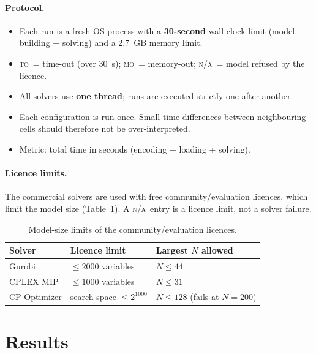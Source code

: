 \documentclass[a4paper,fleqn]{cas-sc}
\newcommand{\TO}{\textsc{to}}
\newcommand{\MO}{\textsc{mo}}
\newcommand{\NA}{\textsc{n/a}}
\begin{document}
\paragraph{Protocol.}
\begin{itemize}
  \item Each run is a fresh OS process with a \textbf{30-second} wall-clock limit (model building + solving) and a 2.7~GB memory limit.
  \item \TO\ = time-out (over 30~s); \MO\ = memory-out; \NA\ = model refused by the licence.
  \item All solvers use \textbf{one thread}; runs are executed strictly one after another.
  \item Each configuration is run once. Small time differences between neighbouring cells should therefore not be over-interpreted.
  \item Metric: total time in seconds (encoding + loading + solving).
\end{itemize}

\paragraph{Licence limits.}
The commercial solvers are used with free community/evaluation licences, which limit the model size (Table~\ref{tab:licence}). A \NA\ entry is a licence limit, not a solver failure.

\begin{table}[pos=htbp]
\caption{Model-size limits of the community/evaluation licences.}\label{tab:licence}
\centering
\begin{tabular}{lll}
\toprule
Solver & Licence limit & Largest $N$ allowed \\
\midrule
Gurobi      & $\le 2000$ variables     & $N\le44$ \\
CPLEX MIP   & $\le 1000$ variables     & $N\le31$ \\
CP Optimizer & search space $\le 2^{1000}$ & $N\le128$ (fails at $N=200$) \\
\bottomrule
\end{tabular}
\end{table}

\section{Results}\label{sec:results}
\end{document}
